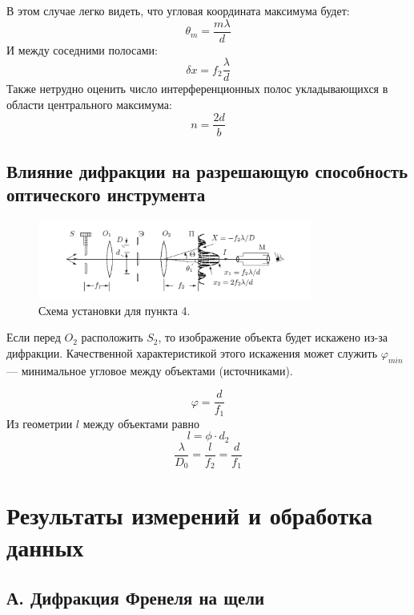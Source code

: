 \documentclass[a4paper]{article}
\begin{document}
В этом случае легко видеть, что угловая координата максимума будет: 
\begin{equation}
\theta_m = \frac{m \lambda}{d}
\end{equation}
И между соседними полосами:
\begin{equation}
\delta x = f_2 \frac{\lambda}{d}
\end{equation}
Также нетрудно оценить число интерференционных полос укладывающихся в области центрального максимума: 
\begin{equation}
n = \frac{2d}{b}
\end{equation}
\subsection{Влияние дифракции на разрешающую способность оптического инструмента}

\begin{figure}[h]
\begin{center}
\includegraphics[width = 0.8\textwidth]{5.png}
\caption{Схема установки для пункта 4.}
\end{center}
\end{figure}

Если перед $O_2$ расположить $S_2$, то изображение объекта будет искажено из-за дифракции. Качественной характеристикой этого искажения может служить $\varphi_{min}$ --- минимальное угловое между объектами (источниками). 

\begin{equation}
\varphi = \frac{d}{f_1}
\end{equation}
Из геометрии $l$ между объектами равно 
\begin{equation}
l = \phi \cdot d_2
\end{equation}
\begin{equation}
\frac{\lambda}{D_0} = \frac{l}{f_2} = \frac{d}{f_1}
\end{equation}

\newpage
\section{Результаты измерений и обработка данных}
\subsection{А. Дифракция Френеля на щели}
\end{document}
